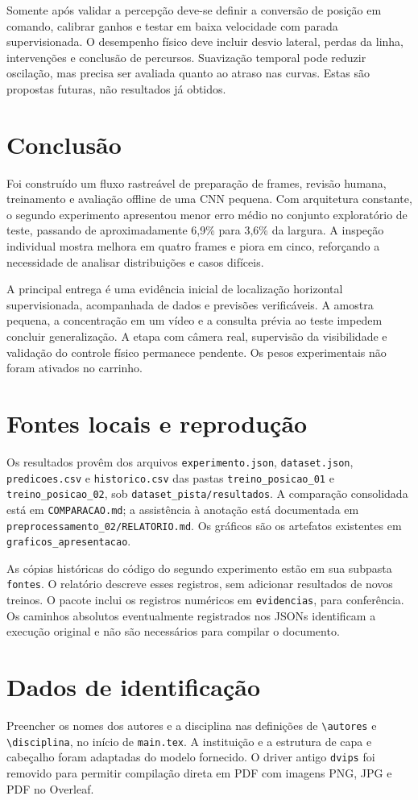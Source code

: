 \documentclass[a4paper,oneside,11pt]{article}
\begin{document}
Somente após validar a percepção deve-se definir a conversão de posição em comando, calibrar ganhos e testar em baixa velocidade com parada supervisionada. O desempenho físico deve incluir desvio lateral, perdas da linha, intervenções e conclusão de percursos. Suavização temporal pode reduzir oscilação, mas precisa ser avaliada quanto ao atraso nas curvas. Estas são propostas futuras, não resultados já obtidos.

\section{Conclusão}
Foi construído um fluxo rastreável de preparação de frames, revisão humana, treinamento e avaliação offline de uma CNN pequena. Com arquitetura constante, o segundo experimento apresentou menor erro médio no conjunto exploratório de teste, passando de aproximadamente 6,9\% para 3,6\% da largura. A inspeção individual mostra melhora em quatro frames e piora em cinco, reforçando a necessidade de analisar distribuições e casos difíceis.

A principal entrega é uma evidência inicial de localização horizontal supervisionada, acompanhada de dados e previsões verificáveis. A amostra pequena, a concentração em um vídeo e a consulta prévia ao teste impedem concluir generalização. A etapa com câmera real, supervisão da visibilidade e validação do controle físico permanece pendente. Os pesos experimentais não foram ativados no carrinho.

\appendix
\section{Fontes locais e reprodução}
Os resultados provêm dos arquivos \texttt{experimento.json}, \texttt{dataset.json}, \texttt{predicoes.csv} e \texttt{historico.csv} das pastas \texttt{treino\_posicao\_01} e \texttt{treino\_posicao\_02}, sob \texttt{dataset\_pista/resultados}. A comparação consolidada está em \texttt{COMPARACAO.md}; a assistência à anotação está documentada em \texttt{preprocessamento\_02/RELATORIO.md}. Os gráficos são os artefatos existentes em \texttt{graficos\_apresentacao}.

As cópias históricas do código do segundo experimento estão em sua subpasta \texttt{fontes}. O relatório descreve esses registros, sem adicionar resultados de novos treinos. O pacote inclui os registros numéricos em \texttt{evidencias}, para conferência. Os caminhos absolutos eventualmente registrados nos JSONs identificam a execução original e não são necessários para compilar o documento.

\section{Dados de identificação}
Preencher os nomes dos autores e a disciplina nas definições de \texttt{\textbackslash autores} e \texttt{\textbackslash disciplina}, no início de \texttt{main.tex}. A instituição e a estrutura de capa e cabeçalho foram adaptadas do modelo fornecido. O driver antigo \texttt{dvips} foi removido para permitir compilação direta em PDF com imagens PNG, JPG e PDF no Overleaf.
\end{document}
